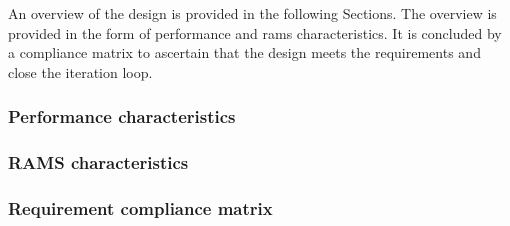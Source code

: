 An overview of the design is provided in the following Sections. The overview is provided in the form of performance and \acrfull{rams} characteristics. It is concluded by a compliance matrix to ascertain that the design meets the requirements and close the iteration loop.

\subsubsection{Performance characteristics} \label{sec:perf}


\newpage
\subsubsection{RAMS characteristics} \label{sec:rams}


\newpage
\subsubsection{Requirement compliance matrix} \label{sec:ComMat}







